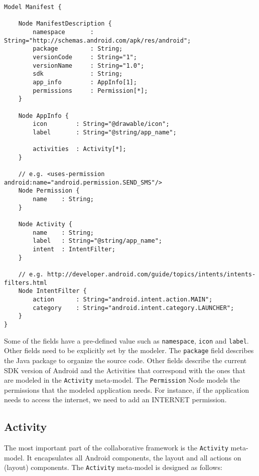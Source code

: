 \begin{lstlisting}[label=application-mm,caption=Manifest meta-model, captionpos=t]
Model Manifest {

	Node ManifestDescription {
		namespace		: String="http://schemas.android.com/apk/res/android";
		package			: String;
		versionCode		: String="1";
		versionName		: String="1.0";
		sdk				: String;
		app_info		: AppInfo[1];
		permissions		: Permission[*];
	}

	Node AppInfo {
		icon 		: String="@drawable/icon";
		label		: String="@string/app_name";

		activities	: Activity[*];
	}

	// e.g. <uses-permission android:name="android.permission.SEND_SMS"/>
	Node Permission {
		name 	: String;
	}

	Node Activity {
		name 	: String;
		label 	: String="@string/app_name";
		intent	: IntentFilter;
	}

	// e.g. http://developer.android.com/guide/topics/intents/intents-filters.html
	Node IntentFilter {
		action 		: String="android.intent.action.MAIN";
		category	: String="android.intent.category.LAUNCHER";
	}
}
\end{lstlisting}
Some of the fields have a pre-defined value such as \texttt{namespace}, \texttt{icon} and \texttt{label}. Other fields need to be explicitly set by the modeler. The \texttt{package} field describes the Java package to organize the source code. Other fields describe the current SDK version of Android and the Activities that correspond with the ones that are modeled in the \texttt{Activity} meta-model. The \texttt{Permission} Node models the permissions that the modeled application needs. For instance, if the application needs to access the internet, we need to add an INTERNET permission.

\subsection{Activity}

The most important part of the collaborative framework is the \texttt{Activity} meta-model. It encapsulates all Android components, the layout and all actions on (layout) components. The \texttt{Activity} meta-model is designed as follows:

